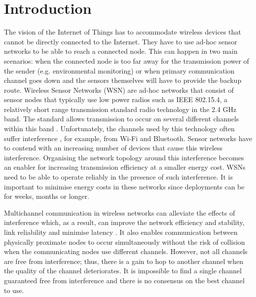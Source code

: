 \section{Introduction}
\label{sec:introduction}
The vision of the Internet of Things has to accommodate wireless devices that cannot be directly connected to the Internet. They have to use ad-hoc sensor networks to be able to reach a connected node. This can happen in two main scenarios: when the connected node is too far away for the transmission power of the sender (e.g. environmental monitoring) or when primary communication channel goes down and the sensors themselves will have to provide the backup route.
Wireless Sensor Networks (WSN) are ad-hoc networks that consist of sensor nodes that typically use low power radios such as IEEE 802.15.4, a relatively short range transmission standard radio technology in the 2.4 GHz band. The standard allows transmission to occur on several different channels within this band \cite{ieee802.15.4}. Unfortunately, the channels used by this technology often suffer interference \cite{Boano:2010:MSM:2127940.2127963, ieeeCompare}, for example, from Wi-Fi \cite{ieee_2012, wu} and Bluetooth. Sensor networks have to contend with an increasing number of devices that cause this wireless interference. Organising the network topology around this interference becomes an enabler for increasing transmission efficiency at a smaller energy cost. WSNs need to be able to operate reliably in the presence of such interference. It is important to minimise energy costs in these networks since deployments can be for weeks, months or longer.

Multichannel communication in wireless networks can alleviate the effects of interference which, as a result, can improve the network efficiency and stability, link reliability and minimise latency \cite{watteyne}. It also enables communication between physically proximate nodes to occur simultaneously without the risk of collision when the communicating nodes use different channels. However, not all channels are free from interference; thus, there is a gain to hop to another channel when the quality of the channel deteriorates. 
It is impossible to find a single channel guaranteed free from interference and there is no consensus on the best channel to use. 

